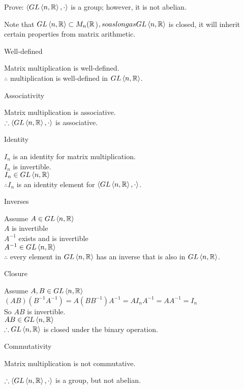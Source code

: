 \documentclass[letterpaper,12pt,fleqn]{article}
\newcommand{\bas}[2]{\left<#1,#2\right>}
\newcommand{\gln}{GL\left<n,\R\right>}
\begin{document}
\begin{example}
  Prove: $\bas{\gln}{\cdot}$ is a group; however, it is not abelian.

  Note that $\gln\subset M_n(\R$)$, so as long as \gln$ is closed, it will
  inherit certain properties from matrix arithmetic.

  \begin{description}
  \item Well-defined

    Matrix multiplication is well-defined. \\
    $\therefore$ multiplication is well-defined in $\gln$.

  \item Associativity

    Matrix multiplication is associative. \\
    $\therefore \bas{\gln}{\cdot}$ is associative.

  \item Identity

    $I_n$ is an identity for matrix multiplication. \\
    $I_n$ is invertible. \\
    $I_n\in\gln$ \\
    $\therefore I_n$ is an identity element for $\bas{\gln}{\cdot}$.
\newpage
  \item Inverses

    Assume $A\in\gln$ \\
    $A$ is invertible \\
    $A^{-1}$ exists and is invertible \\
    $A^{-1}\in\gln$ \\
    $\therefore$ every element in $\gln$ has an inverse that is also in $\gln$.

  \item Closure

    Assume $A,B\in\gln$ \\
    $(AB)(B^{-1}A^{-1})=A(BB^{-1})A^{-1}=AI_nA^{-1}=AA^{-1}=I_n$ \\
    So $AB$ is invertible. \\
    $AB\in\gln$ \\
    $\therefore \gln$ is closed under the binary operation.

  \item Commutativity

    Matrix multiplication is not commutative.
  \end{description}

  \bigskip

  $\therefore \bas{\gln}{\cdot}$ is a group, but not abelian.
\end{example}
\end{document}
